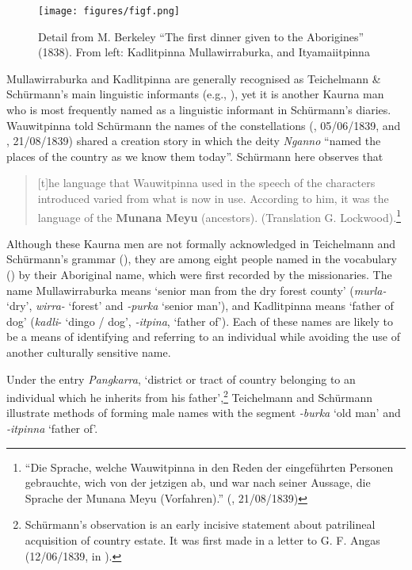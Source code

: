 \begin{figure}[t]
\texttt{[image: figures/figf.png]}
\caption{Detail from M. Berkeley “The first dinner given to the Aborigines” (1838). From left: Kadlitpinna Mullawirraburka, and Ityamaiitpinna \citep[103]{Gara1998}}
\label{fig:key:1.1.3-6}
\end{figure} 

Mullawirraburka and Kadlitpinna are generally recognised as Teichelmann \& Schürmann’s main linguistic informants (e.g., \citealt[64]{amery_warrabarna_2016}), yet it is another Kaurna man who is most frequently named as a linguistic informant in Schürmann’s diaries. Wauwitpinna told Schürmann the names of the constellations (\citealt{schurmann_diaries_1838}, 05/06/1839, and \citealt{schurmann_diaries_1838}, 21/08/1839) shared a creation story in which the deity \textit{Nganno} ``named the places of the country as we know them today''. Schürmann here observes that

\newpage
\begin{quote}
    [t]he language that Wauwitpinna used in the speech of the characters introduced varied from what is now in use. According to him, it was the language of the \textbf{Munana Meyu} (ancestors). (Translation G. Lockwood).\footnote{  ``Die Sprache, welche Wauwitpinna in den Reden der eingeführten Personen gebrauchte, wich von der jetzigen ab, und war nach seiner Aussage, die Sprache der Munana Meyu (Vorfahren).'' (\citealt{schurmann_diaries_1838}, 21/08/1839)}
\end{quote}
  
Although these Kaurna men are not formally acknowledged in Teichelmann and Schürmann’s grammar (\citeyear{teichelmann_outlines_1840}), they are among eight people named in the vocabulary (\citeyear[36]{teichelmann_outlines_1840}) by their Aboriginal name, which were first recorded by the missionaries. The name Mullawirraburka means `senior man from the dry forest county' (\textit{murla-} `dry', \textit{wirra-} `forest' and \textit{-purka} `senior man'), and Kadlitpinna means `father of dog' (\textit{kadli}- `dingo / dog', \textit{-itpina}, `father of'). Each of these names are likely to be a means of identifying and referring to an individual while avoiding the use of another culturally sensitive name. 

Under the entry \textit{Pangkarra}, `district or tract of country belonging to an individual which he inherits from his father',\footnote{Schürmann’s observation is an early incisive statement about patrilineal acquisition of country estate. It was first made in a letter to G. F. Angas (12/06/1839, in \citealt[50]{schurmann_id_1987}).}  Teichelmann and Schürmann illustrate methods of forming male names with the segment \textit{-burka} `old man' and \textit{-itpinna} `father of'.

